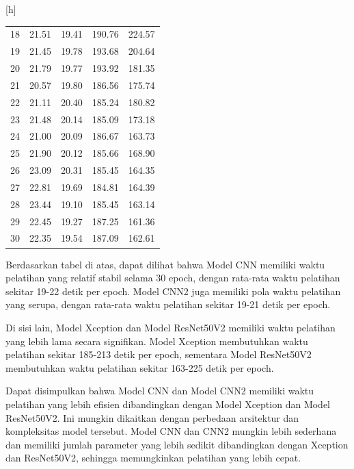 \begin{center}[h]
\begin{table}[htbp]
\begin{tabular}{|c|c|c|c|c|}
	18             & 21.51        & 19.41         & 190.76            & 224.57              \\
	19             & 21.45        & 19.78         & 193.68            & 204.64              \\
	20             & 21.79        & 19.77         & 193.92            & 181.35              \\
	21             & 20.57        & 19.80         & 186.56            & 175.74              \\
	22             & 21.11        & 20.40         & 185.24            & 180.82              \\
	23             & 21.48        & 20.14         & 185.09            & 173.18              \\
	24             & 21.00        & 20.09         & 186.67            & 163.73              \\
	25             & 21.90        & 20.12         & 185.66            & 168.90              \\
	26             & 23.09        & 20.31         & 185.45            & 164.35              \\
	27             & 22.81        & 19.69         & 184.81            & 164.39              \\
	28             & 23.44        & 19.10         & 185.45            & 163.14              \\
	29             & 22.45        & 19.27         & 187.25            & 161.36              \\
	30             & 22.35        & 19.54         & 187.09            & 162.61              \\ 
	\hline
	\end{tabular}
	\end{table}
\end{center}

Berdasarkan tabel di atas, dapat dilihat bahwa Model CNN memiliki waktu pelatihan yang relatif stabil selama 30 epoch, dengan rata-rata waktu pelatihan sekitar 19-22 detik per epoch. Model CNN2 juga memiliki pola waktu pelatihan yang serupa, dengan rata-rata waktu pelatihan sekitar 19-21 detik per epoch.

Di sisi lain, Model Xception dan Model ResNet50V2 memiliki waktu pelatihan yang lebih lama secara signifikan. Model Xception membutuhkan waktu pelatihan sekitar 185-213 detik per epoch, sementara Model ResNet50V2 membutuhkan waktu pelatihan sekitar 163-225 detik per epoch.
	
Dapat disimpulkan bahwa Model CNN dan Model CNN2 memiliki waktu pelatihan yang lebih efisien dibandingkan dengan Model Xception dan Model ResNet50V2. Ini mungkin dikaitkan dengan perbedaan arsitektur dan kompleksitas model tersebut. Model CNN dan CNN2 mungkin lebih sederhana dan memiliki jumlah parameter yang lebih sedikit dibandingkan dengan Xception dan ResNet50V2, sehingga memungkinkan pelatihan yang lebih cepat.

